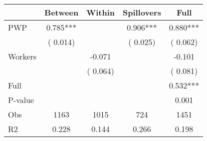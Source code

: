 
\begin{tabular}{l*{4}{c}}\hline&\multicolumn{1}{c}{Between}&\multicolumn{1}{c}{Within}&\multicolumn{1}{c}{Spillovers}&\multicolumn{1}{c}{Full}\\ \hline
 PWP           &              0.785***      &                                               &        0.906*** &         0.880***                            \\ 
                               &        (       0.014)           &                                       &       (       0.025)     &      (       0.062)                                           \\ 
 Workers       &                                               &       -0.071    &                                &            -0.101                            \\ 
                               &                                               & (       0.064)                  &                                        &      (       0.081)                                           \\ 
\hline                                                                                                                                                                                                                                            
 Full                  &                                               &                                               &                                        &             0.532***                                     \\ 
 P-value               &                                               &                                               &                                        &             0.001                                           \\ 
 Obs                   &               1163               &       1015                       &       724                &              1451                                               \\ 
 R2                    &                      0.228              &              0.144                      &              0.266               &                     0.198                                              \\ 
\hline \end{tabular}                                                                                                                                                                                                              